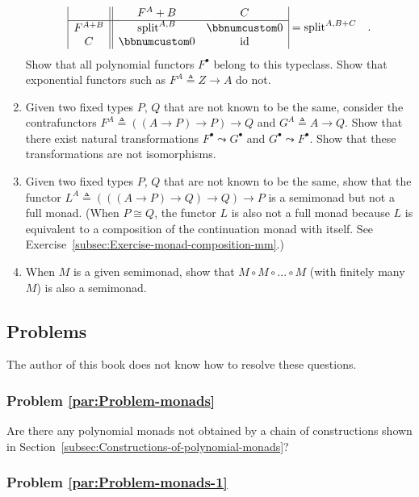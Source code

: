 \begin{enumerate}
\[\begin{array}{|c||cc|}
 & F^{A}+B & C\\
\hline F^{A+B} & \text{split}^{A,B} & \bbnum 0\\
C & \bbnum 0 & \text{id}
\end{array}=\text{split}^{A,B+C}\quad.
\]
Show that all polynomial functors $F^{\bullet}$ belong to this typeclass.
Show that exponential functors such as $F^{A}\triangleq Z\rightarrow A$
do not. 
\item Given two fixed types $P$, $Q$ that are not known to be the same,
consider the contrafunctors $F^{A}\triangleq\left(\left(A\rightarrow P\right)\rightarrow P\right)\rightarrow Q$
and $G^{A}\triangleq A\rightarrow Q$. Show that there exist natural
transformations $F^{\bullet}\leadsto G^{\bullet}$ and $G^{\bullet}\leadsto F^{\bullet}$.
Show that these transformations are not isomorphisms.
\item Given two fixed types $P$, $Q$ that are not known to be the same,
show that the functor $L^{A}\triangleq\left(\left(\left(A\rightarrow P\right)\rightarrow Q\right)\rightarrow Q\right)\rightarrow P$
is a semimonad but not a full monad. (When $P\cong Q$, the functor
$L$ is also not a full monad because $L$ is equivalent to a composition
of the continuation monad with itself. See Exercise~\ref{subsec:Exercise-monad-composition-mm}.)
\item When $M$ is a given semimonad, show that $M\circ M\circ...\circ M$
(with finitely many $M$) is also a semimonad.
\end{enumerate}

\subsection{Problems}

The author of this book does not know how to resolve these questions.

\subsubsection{Problem \label{par:Problem-monads}\ref{par:Problem-monads}}

Are there any polynomial monads not obtained by a chain of constructions
shown in Section~\ref{subsec:Constructions-of-polynomial-monads}?

\subsubsection{Problem \label{par:Problem-monads-1}\ref{par:Problem-monads-1}}

